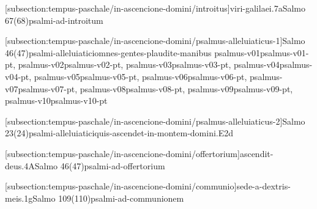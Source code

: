 \def\Prefix{subsection:tempus-paschale/in-ascencione-domini}

[\Prefix/introitus]{viri-galilaei.7a}{Salmo 67(68)}{psalmi-ad-introitum}

\AllowPageFlush

[\Prefix/psalmus-alleluiaticus-1]{Salmo 46(47)}{psalmi-alleluiatici}{omnes-gentes-plaudite-manibus}{
  {psalmus-v01}{psalmus-v01-pt},
  {psalmus-v02}{psalmus-v02-pt},
  {psalmus-v03}{psalmus-v03-pt},
  {psalmus-v04}{psalmus-v04-pt},
  {psalmus-v05}{psalmus-v05-pt},
  {psalmus-v06}{psalmus-v06-pt},
  {psalmus-v07}{psalmus-v07-pt},
  {psalmus-v08}{psalmus-v08-pt},
  {psalmus-v09}{psalmus-v09-pt},
  {psalmus-v10}{psalmus-v10-pt}
}

\AllowPageFlush

[\Prefix/psalmus-alleluiaticus-2]{Salmo 23(24)}{psalmi-alleluiatici}{quis-ascendet-in-montem-domini.E2d}

\AllowPageFlush

[\Prefix/offertorium]{ascendit-deus.4A}{Salmo 46(47)}{psalmi-ad-offertorium}

\AllowPageFlush

[\Prefix/communio]{sede-a-dextris-meis.1g}{Salmo 109(110)}{psalmi-ad-communionem}
